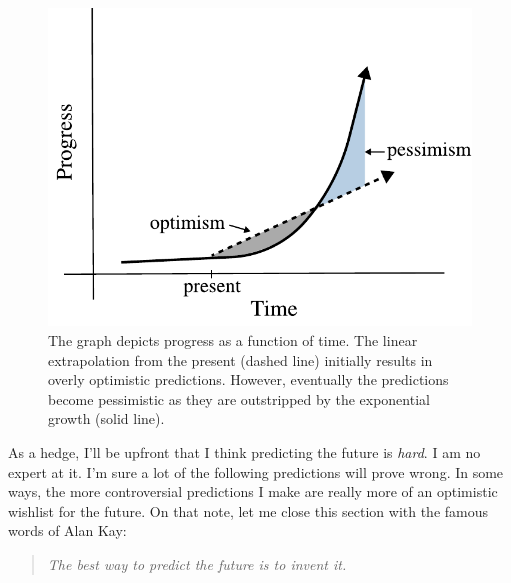 \begin{figure}
    \centering
    \includegraphics[width=\linewidth]{figures/exponential_growth}
    \caption{The graph depicts progress as a function of time. The linear
    extrapolation from the present (dashed line) initially results in overly
    optimistic predictions.  However, eventually the predictions become
    pessimistic as they are outstripped by the exponential growth (solid
    line).}
    \label{fig:exponential_growth}
\end{figure}

As a hedge, I'll be upfront that I think predicting the future is
\emph{hard}. I am no expert at it. I'm sure a lot of the following predictions
will prove wrong. In some ways, the more controversial predictions I make are
really more of an optimistic wishlist for the future. On that note, let me
close this section with the famous words of Alan Kay:
\begin{quote}
    \emph{The best way to predict the future is to invent it.}
\end{quote}
